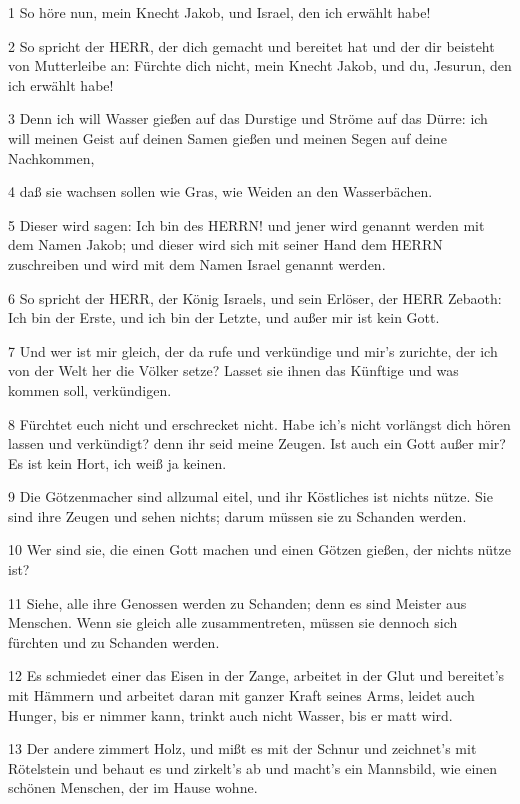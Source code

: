 \par 1 So höre nun, mein Knecht Jakob, und Israel, den ich erwählt habe!
\par 2 So spricht der HERR, der dich gemacht und bereitet hat und der dir beisteht von Mutterleibe an: Fürchte dich nicht, mein Knecht Jakob, und du, Jesurun, den ich erwählt habe!
\par 3 Denn ich will Wasser gießen auf das Durstige und Ströme auf das Dürre: ich will meinen Geist auf deinen Samen gießen und meinen Segen auf deine Nachkommen,
\par 4 daß sie wachsen sollen wie Gras, wie Weiden an den Wasserbächen.
\par 5 Dieser wird sagen: Ich bin des HERRN! und jener wird genannt werden mit dem Namen Jakob; und dieser wird sich mit seiner Hand dem HERRN zuschreiben und wird mit dem Namen Israel genannt werden.
\par 6 So spricht der HERR, der König Israels, und sein Erlöser, der HERR Zebaoth: Ich bin der Erste, und ich bin der Letzte, und außer mir ist kein Gott.
\par 7 Und wer ist mir gleich, der da rufe und verkündige und mir's zurichte, der ich von der Welt her die Völker setze? Lasset sie ihnen das Künftige und was kommen soll, verkündigen.
\par 8 Fürchtet euch nicht und erschrecket nicht. Habe ich's nicht vorlängst dich hören lassen und verkündigt? denn ihr seid meine Zeugen. Ist auch ein Gott außer mir? Es ist kein Hort, ich weiß ja keinen.
\par 9 Die Götzenmacher sind allzumal eitel, und ihr Köstliches ist nichts nütze. Sie sind ihre Zeugen und sehen nichts; darum müssen sie zu Schanden werden.
\par 10 Wer sind sie, die einen Gott machen und einen Götzen gießen, der nichts nütze ist?
\par 11 Siehe, alle ihre Genossen werden zu Schanden; denn es sind Meister aus Menschen. Wenn sie gleich alle zusammentreten, müssen sie dennoch sich fürchten und zu Schanden werden.
\par 12 Es schmiedet einer das Eisen in der Zange, arbeitet in der Glut und bereitet's mit Hämmern und arbeitet daran mit ganzer Kraft seines Arms, leidet auch Hunger, bis er nimmer kann, trinkt auch nicht Wasser, bis er matt wird.
\par 13 Der andere zimmert Holz, und mißt es mit der Schnur und zeichnet's mit Rötelstein und behaut es und zirkelt's ab und macht's ein Mannsbild, wie einen schönen Menschen, der im Hause wohne.
